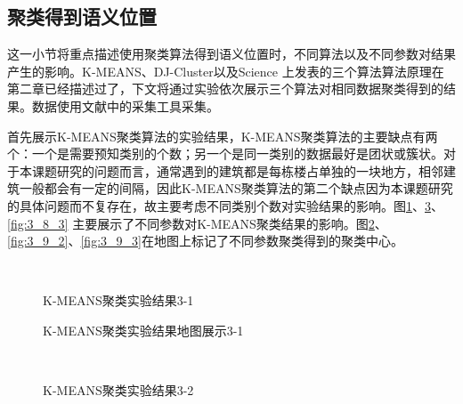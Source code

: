 \subsection{聚类得到语义位置}
这一小节将重点描述使用聚类算法得到语义位置时，不同算法以及不同参数对结果产生的影响。K-MEANS、DJ-Cluster以及Science 上发表的三个算法算法原理在第二章已经描述过了，下文将通过实验依次展示三个算法对相同数据聚类得到的结果。数据使用文献\cite{rawassizadeh2013ubiqlog}中的采集工具采集。
\par 首先展示K-MEANS聚类算法的实验结果，K-MEANS聚类算法的主要缺点有两个：一个是需要预知类别的个数；另一个是同一类别的数据最好是团状或簇状。对于本课题研究的问题而言，通常遇到的建筑都是每栋楼占单独的一块地方，相邻建筑一般都会有一定的间隔，因此K-MEANS聚类算法的第二个缺点因为本课题研究的具体问题而不复存在，故主要考虑不同类别个数对实验结果的影响。图\ref{fig:3_8_1}、\ref{fig:3_8_2}、\ref{fig:3_8_3} 主要展示了不同参数对K-MEANS聚类结果的影响。图\ref{fig:3_9_1}、\ref{fig:3_9_2}、\ref{fig:3_9_3}在地图上标记了不同参数聚类得到的聚类中心。
\begin{figure}[htb]
  \centering%
  \\
  \caption{K-MEANS聚类实验结果3-1}
  \label{fig:3_8_1}
\end{figure}
\begin{figure}[htb]
  \centering%
  \caption{K-MEANS聚类实验结果地图展示3-1}
  \label{fig:3_9_1}
\end{figure}
\begin{figure}[htb]
  \centering%
  \\
  \caption{K-MEANS聚类实验结果3-2}
  \label{fig:3_8_2}
\end{figure}
